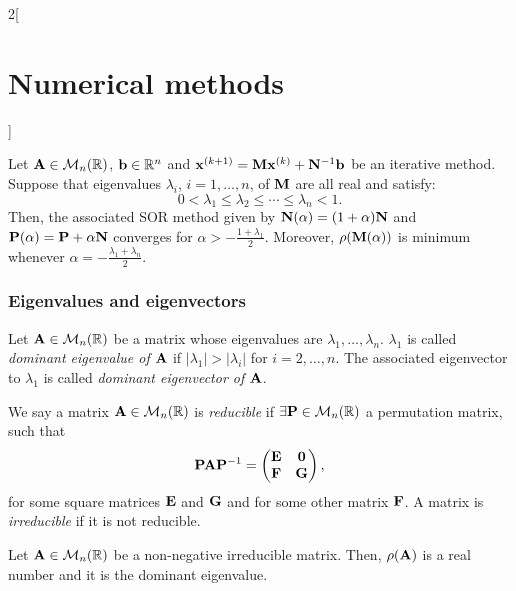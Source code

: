 \documentclass[../../../main.tex]{subfiles}
\begin{document}
\begin{multicols}{2}[\section{Numerical methods}]
\begin{definition}
\end{definition}
\begin{theorem}
    Let $\vb{A}\in\mathcal{M}_n(\mathbb{R})$, $\vb{b}\in\mathbb{R}^n$ and $\vb{x}^{(k+1)}=\vb{M}\vb{x}^{(k)}+\vb{N}^{-1}\vb{b}$ be an iterative method. Suppose that eigenvalues $\lambda_i$, $i=1,\ldots,n$, of $\vb{M}$ are all real and satisfy: $$0<\lambda_1\leq\lambda_2\leq\cdots\leq\lambda_n<1.$$
    Then, the associated SOR method given by $\vb{N}(\alpha)=(1+\alpha)\vb{N}$ and $\vb{P}(\alpha)=\vb{P}+\alpha\vb{N}$ converges for $\alpha>-\frac{1+\lambda_1}{2}$. Moreover, $\rho(\vb{M}(\alpha))$ is minimum whenever $\alpha=-\frac{\lambda_1+\lambda_n}{2}$.
\end{theorem}
\subsubsection*{Eigenvalues and eigenvectors}
\begin{definition}
    Let $\vb{A}\in\mathcal{M}_n(\mathbb{R})$ be a matrix whose eigenvalues are $\lambda_1,\ldots,\lambda_n$. $\lambda_1$ is called \textit{dominant eigenvalue of $\vb{A}$} if $|\lambda_1|>|\lambda_i|$ for $i=2,\ldots,n$. The associated eigenvector to $\lambda_1$ is called \textit{dominant eigenvector of $\vb{A}$}.
\end{definition}
\begin{definition}
    We say a matrix $\vb{A}\in\mathcal{M}_n(\mathbb{R})$ is \textit{reducible} if $\exists\vb{P}\in\mathcal{M}_n(\mathbb{R})$ a permutation matrix, such that $$\vb{P}\vb{A}\vb{P}^{-1}=
    \begin{pmatrix}
        \vb{E} & \vb{0}\\
        \vb{F} & \vb{G}
    \end{pmatrix},$$ for some square matrices $\vb{E}$ and $\vb{G}$ and for some other matrix $\vb{F}$. A matrix is \textit{irreducible} if it is not reducible.
\end{definition}
\begin{theorem}
    Let $\vb{A}\in\mathcal{M}_n(\mathbb{R})$ be a non-negative irreducible matrix. Then, $\rho(\vb{A})$ is a real number and it is the dominant eigenvalue.
\end{theorem}
\begin{definition}

\end{definition}
\end{multicols}
\end{document}
